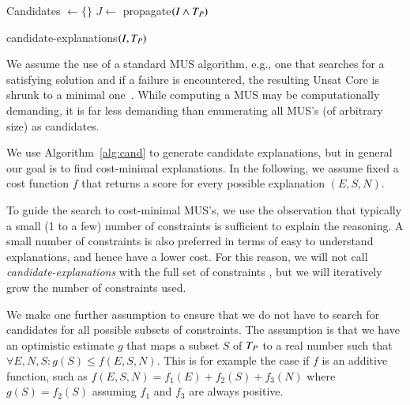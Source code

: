 \begin{algorithm}
  \DontPrintSemicolon
  

  Candidates $\gets \{\}$\;
  $J \gets$ propagate$(I \wedge T_P)$\;
  \caption{candidate-explanations$(I,T_P)$}

  \label{alg:cand}
\end{algorithm}

We assume the use of a standard MUS algorithm, e.g., one that searches for a satisfying solution and if a failure is encountered, the resulting Unsat Core is shrunk to a minimal one~\cite{marques2010minimal}. While computing a MUS may be computationally demanding, it is far less demanding than enumerating all MUS's (of arbitrary size) as candidates.

We use Algorithm~\ref{alg:cand} to generate candidate explanations, but in general our goal is to find cost-minimal explanations. In the following, we assume fixed a cost function $f$ that returns a score for every possible explanation $(E, S, N)$.

To guide the search to cost-minimal MUS's, we use the observation that typically a small (1 to a few) number of constraints is sufficient to explain the reasoning. A small number of constraints is also preferred in terms of easy to understand explanations, and hence have a lower cost. For this reason, we will  not call \textit{candidate-explanations} with the full set of constraints \allconstraints, but we will iteratively grow the number of constraints used.

We make one further assumption to ensure that we do not have to search for candidates for all possible subsets of constraints. The assumption is that we have an optimistic estimate $g$ that maps a subset $S$ of $T_P$ to a real number such that  $\forall E, N, S: g(S) \leq f(E, S, N)$. This is for example the case if $f$ is an additive function, such as $f(E, S, N) = f_1(E) + f_2(S) + f_3(N)$ where $g(S) = f_2(S)$ assuming $f_1$ and $f_3$ are always positive.

